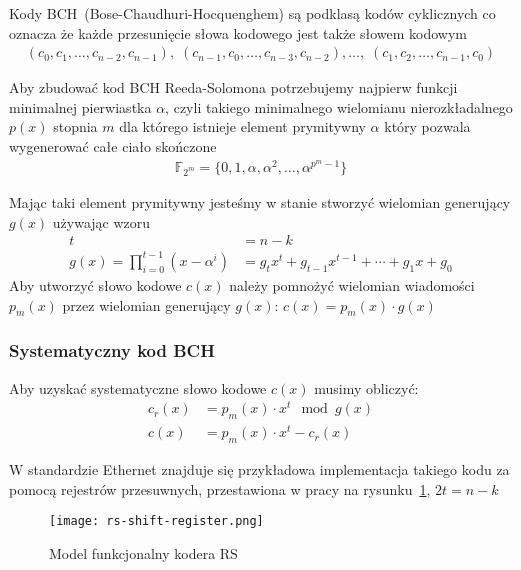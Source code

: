 Kody BCH~(Bose-Chaudhuri-Hocquenghem) są podklasą kodów cyklicznych co oznacza że każde przesunięcie słowa kodowego jest także słowem kodowym
\begin{align*}
    (c_0, c_1,\ldots, c_{n-2}, c_{n-1}), \;
    (c_{n-1}, c_0, \ldots, c_{n-3}, c_{n-2}),\ldots, \;
    (c_1, c_2, \ldots, c_{n-1}, c_{0})
\end{align*}

Aby zbudować kod BCH Reeda-Solomona potrzebujemy najpierw funkcji minimalnej pierwiastka $\alpha$, czyli takiego minimalnego wielomianu nierozkładalnego $p(x)$ stopnia $m$ dla którego istnieje element prymitywny $\alpha$ który pozwala wygenerować całe ciało skończone
\begin{align*}
    \mathbb{F}_{2^m} = \{0, 1, \alpha, \alpha^2, \ldots, \alpha^{p^{m}-1} \}
\end{align*}

Mając taki element prymitywny jesteśmy w stanie stworzyć wielomian generujący $g(x)$ używając wzoru
\begin{align*}
    t &= n - k \\
    g(x) = \prod_{i=0}^{t-1} (x - \alpha^i) &= g_{t}x^t + g_{t-1}x^{t-1} +
    \cdots + g_{1}x + g_{0}
\end{align*}
Aby utworzyć słowo kodowe $c(x)$ należy pomnożyć wielomian wiadomości $p_m(x)$ przez wielomian generujący $g(x)$: $c(x) = p_{m}(x) \cdot g(x)$

\subsubsection{Systematyczny kod BCH}

Aby uzyskać systematyczne słowo kodowe $c(x)$ musimy obliczyć:
\begin{align*}
    c_r(x) &= p_m(x) \cdot x^t \mod g(x) \\
    c(x) &= p_m(x) \cdot x^t - c_r(x)
\end{align*}

W standardzie Ethernet znajduje się przykładowa implementacja takiego kodu za pomocą rejestrów przesuwnych, przestawiona w pracy na rysunku~\ref{model-funkcjonalny}, $2t=n-k$
\begin{figure}[H]
    \texttt{[image: rs-shift-register.png]}
    \caption{Model funkcjonalny kodera RS~\cite[sekcja 91.5.2.7]{Ethernet}}\label{model-funkcjonalny}
\end{figure}
